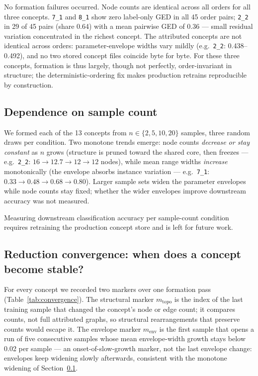 \documentclass[conference]{IEEEtran}
\newcommand{\cid}[1]{\texttt{#1}}   %
\begin{document}
No formation failures occurred. Node counts are identical across all
orders for all three concepts. \cid{7\_1} and \cid{8\_1} show zero
label-only GED in all 45 order pairs; \cid{2\_2} in 29 of 45 pairs
(share 0.64) with a mean pairwise GED of
0.36 --- small residual variation concentrated in the richest concept.
The attributed concepts are not identical across orders:
parameter-envelope widths vary mildly (e.g.\ \cid{2\_2}:
0.438--0.492), and no two stored concept files coincide byte for byte.
For these three concepts, formation is thus largely, though not perfectly,
order-invariant in structure; the deterministic-ordering fix makes
production retrains reproducible by construction.

\subsection{Dependence on sample count}
\label{sec:samplecount}

We formed each of the 13 concepts from $n \in \{2, 5, 10, 20\}$ samples,
three random draws per condition. Two monotone trends emerge: node counts
\emph{decrease or stay constant}
as $n$ grows (structure is pruned toward the shared core, then freezes ---
e.g.\ \cid{2\_2}: $16 \to 12.7 \to 12 \to 12$ nodes), while mean
range widths \emph{increase} monotonically (the envelope absorbs
instance variation --- e.g.\ \cid{7\_1}: $0.33 \to 0.48 \to 0.68 \to 0.80$).
Larger sample sets widen the parameter envelopes
while node counts stay fixed; whether the wider envelopes improve
downstream accuracy was not measured.

Measuring
downstream classification accuracy per sample-count condition requires
retraining the production concept store and is left for future work.

\subsection{Reduction convergence: when does a concept become stable?}
\label{sec:convergence}

For every concept we recorded two markers over one formation pass
(Table~\ref{tab:convergence}). The
structural marker $m_\text{topo}$ is the index of the last training sample
that changed the concept's node or edge count; it compares counts, not
full attributed graphs, so structural rearrangements that preserve counts
would escape it. The envelope marker $m_\text{env}$ is the first sample
that opens a run of five consecutive samples whose mean envelope-width
growth stays below 0.02 per sample --- an onset-of-slow-growth marker,
not the last envelope change: envelopes keep widening slowly afterwards,
consistent with the monotone widening of
Section~\ref{sec:samplecount}.
\end{document}
